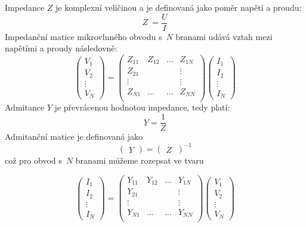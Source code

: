 \documentclass{protokol}
\begin{document}
Impedance $Z$ je komplexní veličinou a je definovaná jako poměr napětí a proudu:
\begin{equation}
	Z~= \frac{U}{I}
\end{equation}
Impedanční matice mikrovlnného obvodu s~$N$ branami
udává vztah mezi napětími a proudy následovně:
\[
\begin{pmatrix}
	V_1     \\
	V_2		\\
	\vdots	\\
	V_N
\end{pmatrix}
=
\begin{pmatrix}
	Z_{11} & Z_{12} & \dots & Z_{1N}   \\
	Z_{21} &		& 		& \vdots	\\
	\vdots &		& 		& \vdots	\\
	Z_{N1} & \dots	& \dots & Z_{NN} 	\\
\end{pmatrix}
%
\begin{pmatrix}
	I_1     \\
	I_2		\\
	\vdots	\\
	I_N
\end{pmatrix}
\]
Admitance $Y$ je převrácenou hodnotou impedance, tedy platí:
\begin{equation}
	Y = \frac{1}{Z}
\end{equation}
Admitanční matice je definovaná jako
\[
\begin{pmatrix}
	Y
\end{pmatrix}
=
\begin{pmatrix}
	Z~\end{pmatrix}^{-1}
\]
což pro obvod s~$N$ branami můžeme rozepsat ve tvaru

\[
\begin{pmatrix}
	I_1     \\
	I_2		\\
	\vdots	\\
	I_N
\end{pmatrix}
=
\begin{pmatrix}
	Y_{11} & Y_{12} & \dots & Y_{1N}   \\
	Y_{21} &		& 		& \vdots	\\
	\vdots &		& 		& \vdots	\\
	Y_{N1} & \dots	& \dots & Y_{NN} 	\\
\end{pmatrix}
%
\begin{pmatrix}
	V_1     \\
	V_2		\\
	\vdots	\\
	V_N
\end{pmatrix}
\]
\end{document}
